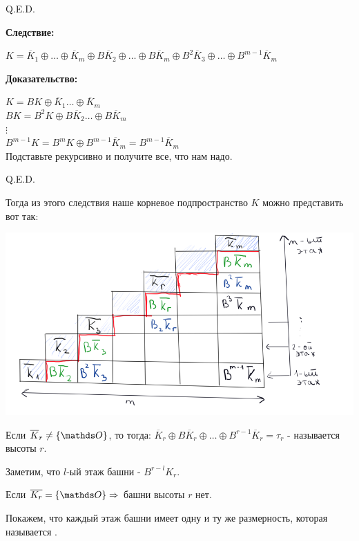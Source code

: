 \hfill Q.E.D.


\textbf{Следствие:}

$K = \overline{K}_1 \oplus \ldots \oplus \overline{K}_m \oplus B\overline{K}_2 \oplus \ldots \oplus B\overline{K}_m \oplus B^2\overline{K}_3  \oplus \ldots \oplus B^{m-1}\overline{K}_{m}$

\textbf{Доказательство:}


$K = BK \oplus \overline{K}_1\ldots \oplus \overline{K}_m$\\
$ BK = B^2K \oplus B\overline{K}_2\ldots \oplus B\overline{K}_m$\\
$\vdots$\\
$B^{m-1}K = B^m K \oplus B^{m-1}\overline{K}_m = B^{m-1} \overline{K}_m $\\
Подставьте рекурсивно и получите все, что нам надо.

\hfill Q.E.D.

Тогда из этого следствия наше корневое подпространство $K$ можно представить вот так:

\begin{center}
   \includegraphics[width = 15cm]{assets/7_9-zhordan-pyramide.png}
\end{center}

 Если $\overline{K}_r\neq \{\zero\}$, то тогда:
$\overline{K}_r \oplus B\overline{K}_r \oplus \ldots \oplus B^{r-1}\overline{K}_{r} = \tau_r$ - называется  высоты $r$.

Заметим, что $l$-ый этаж башни - $B^{r-l} K_r$. 

 Если $\overline{K_r}=\{\zero\} \Rightarrow$ башни высоты $r$ нет.

Покажем, что каждый этаж башни имеет одну и ту же размерность, которая называется .


